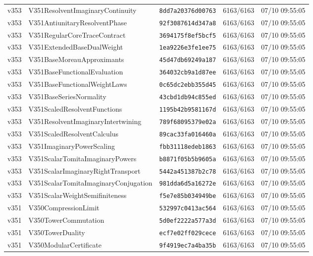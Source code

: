 \documentclass[11pt]{article}
\theoremstyle{definition}\newtheorem{deriv}{Derivação}
\begin{document}
{\begin{longtable}{@{}lllll@{}}
v353 & V351ResolventImaginaryContinuity & \texttt{8dd7a20376d00763} & 6163/6163 & 07/10 09:55:05 \\
v353 & V351AntiunitaryResolventPhase & \texttt{92f3087614d347a8} & 6163/6163 & 07/10 09:55:05 \\
v353 & V351RegularCoreTraceContract & \texttt{3694175f8ef5bcf5} & 6163/6163 & 07/10 09:55:05 \\
v353 & V351ExtendedBaseDualWeight & \texttt{1ea9226e3fe1ee75} & 6163/6163 & 07/10 09:55:05 \\
v353 & V351BaseMoreauApproximants & \texttt{45d47db69249a187} & 6163/6163 & 07/10 09:55:05 \\
v353 & V351BaseFunctionalEvaluation & \texttt{364032cb9a1d87ee} & 6163/6163 & 07/10 09:55:05 \\
v353 & V351BaseFunctionalWeightLaws & \texttt{0c65dc2ebb355d45} & 6163/6163 & 07/10 09:55:05 \\
v353 & V351BaseSeriesNormality & \texttt{43cbd1db94c855ed} & 6163/6163 & 07/10 09:55:05 \\
v353 & V351ScaledResolventFunctions & \texttt{1195b42b9581167d} & 6163/6163 & 07/10 09:55:05 \\
v353 & V351ResolventImaginaryIntertwining & \texttt{789f68095379e02a} & 6163/6163 & 07/10 09:55:05 \\
v353 & V351ScaledResolventCalculus & \texttt{89cac33fa016460a} & 6163/6163 & 07/10 09:55:05 \\
v353 & V351ImaginaryPowerScaling & \texttt{fbb31118edeb1863} & 6163/6163 & 07/10 09:55:05 \\
v353 & V351ScalarTomitaImaginaryPowers & \texttt{b8871f05b5b9605a} & 6163/6163 & 07/10 09:55:05 \\
v353 & V351ScalarImaginaryRightTransport & \texttt{5442a451387b2c78} & 6163/6163 & 07/10 09:55:05 \\
v353 & V351ScalarTomitaImaginaryConjugation & \texttt{981dda6d5a16272e} & 6163/6163 & 07/10 09:55:05 \\
v353 & V351ScalarWeightSemifiniteness & \texttt{f5e7e85b034949be} & 6163/6163 & 07/10 09:55:05 \\
v351 & V350CompressionLimit & \texttt{532997c0413ac564} & 6163/6163 & 07/10 09:55:05 \\
v351 & V350TowerCommutation & \texttt{5d0ef2222a577a3d} & 6163/6163 & 07/10 09:55:05 \\
v351 & V350TowerDuality & \texttt{ecf7e02ff029cece} & 6163/6163 & 07/10 09:55:05 \\
v351 & V350ModularCertificate & \texttt{9f4919ec7a4ba35b} & 6163/6163 & 07/10 09:55:05 \\

\end{longtable}}
\end{document}
